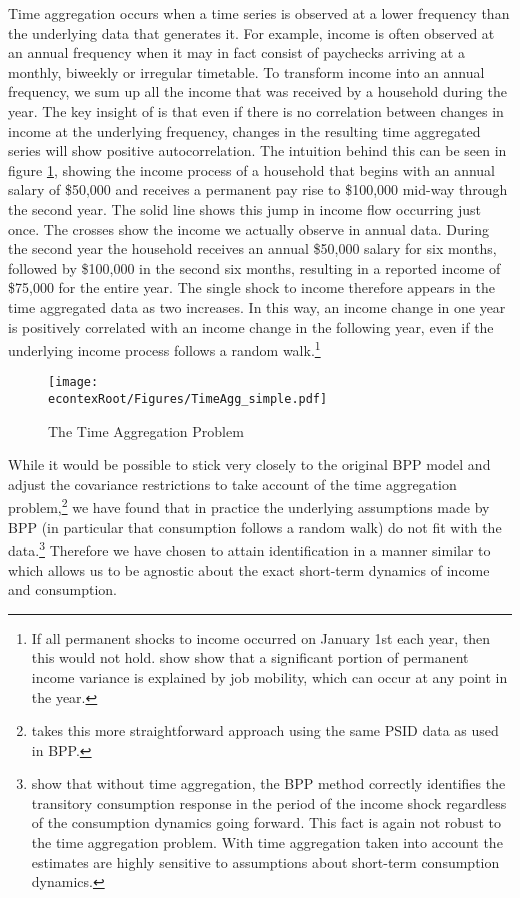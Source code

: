 \documentclass[titlepage]{\econtex}\newcommand{\texname}{ConsumptionHeterogeneity}
\begin{document}
Time aggregation occurs when a time series is observed at a lower frequency than the underlying data that generates it. For example, income is often observed at an annual frequency when it may in fact consist of paychecks arriving at a monthly, biweekly or irregular timetable. To transform income into an annual frequency, we sum up all the income that was received by a household during the year. The key insight of \cite{working_note_1960} is that even if there is no correlation between changes in income at the underlying frequency, changes in the resulting time aggregated series will show positive autocorrelation. The intuition behind this can be seen in figure \ref{fig:TimeAgg}, showing the income process of a household that begins with an annual salary of \$50,000 and receives a permanent pay rise to \$100,000 mid-way through the second year. The solid line shows this jump in income flow occurring just once. The crosses show the income we actually observe in annual data. During the second year the household receives an annual \$50,000 salary for six months, followed by \$100,000 in the second six months, resulting in a reported income of \$75,000 for the entire year. The single shock to income therefore appears in the time aggregated data as two increases. In this way, an income change in one year is positively correlated with an income change in the following year, even if the underlying income process follows a random walk.\footnote{If all permanent shocks to income occurred on January 1st each year, then this would not hold. \cite{low_wage_2010} show show that a significant portion of permanent income variance is explained by job mobility, which can occur at any point in the year.}
\begin{figure} 
	\begin{centering}
		\texttt{[image: \\econtexRoot/Figures/TimeAgg\_simple.pdf]} 
		\caption{The Time Aggregation Problem}
		\label{fig:TimeAgg}
	\end{centering}
\end{figure}

While it would be possible to stick very closely to the original BPP model and adjust the covariance restrictions to take account of the time aggregation problem,\footnote{\cite{crawley_time_2018} takes this more straightforward approach using the same PSID data as used in BPP.} we have found that in practice the underlying assumptions made by BPP (in particular that consumption follows a random walk) do not fit with the data.\footnote{\cite{kaplan_how_2010} show that without time aggregation, the BPP method correctly identifies the transitory consumption response in the period of the income shock regardless of the consumption dynamics going forward. This fact is again not robust to the time aggregation problem. With time aggregation taken into account the estimates are highly sensitive to assumptions about short-term consumption dynamics.} Therefore we have chosen to attain identification in a manner similar to \cite{carroll_nature_1997} which allows us to be agnostic about the exact short-term dynamics of income and consumption.
\end{document}
